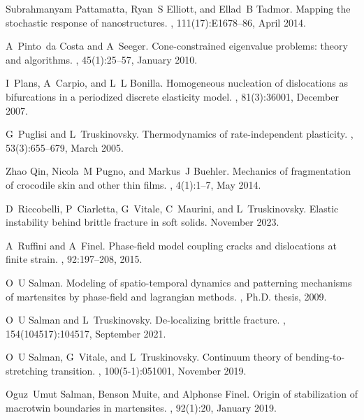 \documentclass[10pt]{article}
\begin{document}
\begin{thebibliography}{10}
Subrahmanyam Pattamatta, Ryan~S Elliott, and Ellad~B Tadmor.
\newblock Mapping the stochastic response of nanostructures.
, 111(17):E1678--86, April 2014.

A~Pinto~da Costa and A~Seeger.
\newblock Cone-constrained eigenvalue problems: theory and algorithms.
, 45(1):25--57, January 2010.

I~Plans, A~Carpio, and L~L Bonilla.
\newblock Homogeneous nucleation of dislocations as bifurcations in a periodized discrete elasticity model.
, 81(3):36001, December 2007.

G~Puglisi and L~Truskinovsky.
\newblock Thermodynamics of rate-independent plasticity.
, 53(3):655--679, March 2005.

Zhao Qin, Nicola~M Pugno, and Markus~J Buehler.
\newblock Mechanics of fragmentation of crocodile skin and other thin films.
, 4(1):1--7, May 2014.

D~Riccobelli, P~Ciarletta, G~Vitale, C~Maurini, and L~Truskinovsky.
\newblock Elastic instability behind brittle fracture in soft solids.
\newblock November 2023.

A~Ruffini and A~Finel.
\newblock Phase-field model coupling cracks and dislocations at finite strain.
, 92:197--208, 2015.

O~U Salman.
\newblock Modeling of spatio-temporal dynamics and patterning mechanisms of martensites by phase-field and lagrangian methods.
, Ph.D. thesis, 2009.

O~U Salman and L~Truskinovsky.
\newblock De-localizing brittle fracture.
, 154(104517):104517, September 2021.

O~U Salman, G~Vitale, and L~Truskinovsky.
\newblock Continuum theory of bending-to-stretching transition.
, 100(5-1):051001, November 2019.

Oguz~Umut Salman, Benson Muite, and Alphonse Finel.
\newblock Origin of stabilization of macrotwin boundaries in martensites.
, 92(1):20, January 2019.


\end{thebibliography}
\end{document}
